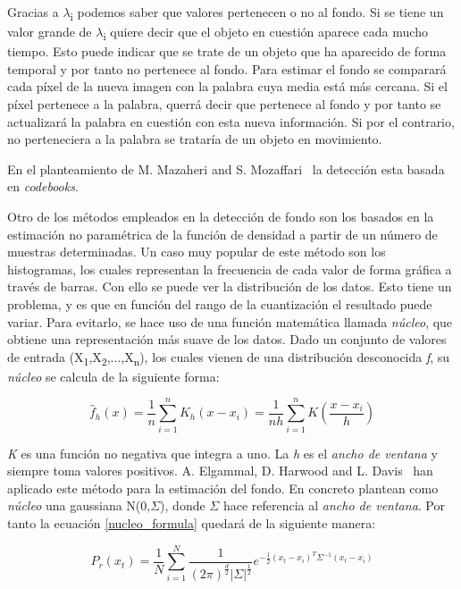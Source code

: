 Gracias a $\lambda$\textsubscript{i} podemos saber que valores pertenecen o no al fondo. Si se tiene un valor grande de $\lambda$\textsubscript{i} quiere decir que el objeto en cuestión aparece cada mucho tiempo. Esto puede indicar que se trate de un objeto que ha aparecido de forma temporal y por tanto no pertenece al fondo. Para estimar el fondo se comparará cada píxel de la nueva imagen con la palabra cuya media está más cercana. Si el píxel pertenece a la palabra, querrá decir que pertenece al fondo y por tanto se actualizará la palabra en cuestión con esta nueva información. Si por el contrario, no perteneciera a la palabra se trataría de un objeto en movimiento.

En el planteamiento de M. Mazaheri and S. Mozaffari~\cite{real_time_adaptative_background} la detección esta basada en \textit{codebooks}.

Otro de los métodos empleados en la detección de fondo son los basados en la estimación no paramétrica de la función de densidad a partir de un número de muestras determinadas. Un caso muy popular de este método son los histogramas, los cuales representan la frecuencia de cada valor de forma gráfica a través de barras. Con ello se puede ver la distribución de los datos. Esto tiene un problema, y es que en función del rango de la cuantización el resultado puede variar. Para evitarlo, se hace uso de una función matemática llamada \textit{núcleo}, que obtiene una representación más suave de los datos. Dado un conjunto de valores de entrada (X\textsubscript{1},X\textsubscript{2},...,X\textsubscript{n}), los cuales vienen de una distribución desconocida \textit{f}, su \textit{núcleo} se calcula de la siguiente forma:

\begin{equation}\label{nucleo_formula}
\widehat{f}_{h}(x) = \frac{1}{n}\sum_{i=1}^{n}K_{h}(x - x_{i}) = \frac{1}{nh}\sum_{i=1}^{n}K(\frac{x - x_{i}}{h})
\end{equation}

\textit{K} es una función no negativa que integra a uno. La \textit{h} es el \textit{ancho de ventana} y siempre toma valores positivos. 
A. Elgammal, D. Harwood and L. Davis~\cite{non_parametric_model} han aplicado este método para la estimación del fondo. En concreto plantean como \textit{núcleo} una gaussiana N(0,$\Sigma$), donde $\Sigma$ hace referencia al \textit{ancho de ventana}. Por tanto la ecuación \ref{nucleo_formula} quedará de la siguiente manera:

\begin{equation}\label{nucleo_formula_new}
{P}_{r}(x_{t}) = \frac{1}{N}\sum_{i=1}^{N}\frac{1}{(2\pi)^\frac{d}{2}|\Sigma|^\frac{1}{2}} e^{-\frac{1}{2}(x_{t}-x_{i})^{T}\Sigma^{-1}(x_{t}-x_{i})}
\end{equation}

